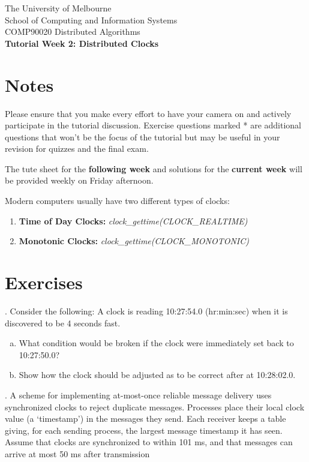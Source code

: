 \documentclass[12pt]{article}
\newcounter{question}
\newcommand{\question}[1]{
    \stepcounter{question}
    \thequestion. #1 \hfill
}
\begin{document}
\begin{center}
    {\sc The University of Melbourne
        \\
        School of Computing and Information Systems
        \\
    COMP90020 Distributed Algorithms}
    \bigskip \\
    {\Large\bf Tutorial Week 2: Distributed Clocks}
    \bigskip \\
\end{center}
\section*{Notes}
Please ensure that you make every effort to have your camera on and actively participate in the tutorial discussion. Exercise questions marked * are additional questions that won't be the focus of the tutorial but may be useful in your revision for quizzes and the final exam.

The tute sheet for the \textbf{following week} and solutions for the \textbf{current week} will be provided weekly on Friday afternoon.

Modern computers usually have two different types of clocks:

\begin{enumerate}
    \item \textbf{Time of Day Clocks:} \textit{clock\_gettime(CLOCK\_REALTIME)}
    \item \textbf{Monotonic Clocks:}  \textit{clock\_gettime(CLOCK\_MONOTONIC)}
\end{enumerate}

\section*{Exercises}

\question{Consider the following: A clock is reading 10:27:54.0 (hr:min:sec) when it is discovered to be 4 seconds fast.}

\begin{enumerate}[(a)]
    \item What condition would be broken if the clock were immediately set back to 10:27:50.0?
    \item Show how the clock should be adjusted as to be correct after at 10:28:02.0.
\end{enumerate}

\question{A scheme for implementing at-most-once reliable message delivery uses synchronized clocks to reject duplicate messages. Processes place their local clock value (a ‘timestamp’) in the messages they send. Each receiver keeps a table giving, for each sending process, the largest message timestamp it has seen. Assume that clocks are synchronized to within 101 ms, and that messages can arrive at most 50 ms after transmission}
\end{document}
